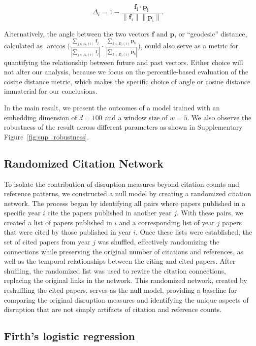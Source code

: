\documentclass[12pt]{article}
\begin{document}
\begin{refsection}
\[
    \Delta_i =1-\frac{\mathbf{f_i}\cdot \mathbf{p_i}}{\| \mathbf{f_i}\| \|\mathbf{p_i}\|}.
\]




Alternatively, the angle between the two vectors $\mathbf{f}$ and $\mathbf{p}$, or ``geodesic'' distance, calculated as  
$\arccos \Big(
    \frac{\sum_{j\in A_c(i)}\mathbf{f}_j}{|\sum_{j\in A_c(i)}\mathbf{f}_j|}
    \cdot 
    \frac{\sum_{k \in D_c(i)} \mathbf{p}_k}{|\sum_{k \in D_c(i)} \mathbf{p}_k|}\Big)
$,
could also serve as a metric for quantifying the relationship between future and past vectors. Either choice will not alter our analysis, because we focus on the percentile-based evaluation of the cosine distance metric, which makes the specific choice of angle or cosine distance immaterial for our conclusions. 


In the main result, we present the outcomes of a model trained with an embedding dimension of $d = 100$ and a window size of $w = 5$. We also observe the robustness of the result across different parameters as shown in Supplementary Figure~\ref{fig:sup_robustness}.



\subsection{Randomized Citation Network}
\label{sec:method_null_model}
To isolate the contribution of disruption measures beyond citation counts and reference patterns, we constructed a null model by creating a randomized citation network. The process began by identifying all pairs where papers published in a specific year $i$ cite the papers published in another year $j$. With these pairs, we created a list of papers published in $i$ and a corresponding list of year $j$ papers that were cited by those published in year $i$. Once these lists were established, the set of cited papers from year $j$ was shuffled, effectively randomizing the connections while preserving the original number of citations and references, as well as the temporal relationships between the citing and cited papers. After shuffling, the randomized list was used to rewire the citation connections, replacing the original links in the network. This randomized network, created by reshuffling the cited papers, serves as the null model, providing a baseline for comparing the original disruption measures and identifying the unique aspects of disruption that are not simply artifacts of citation and reference counts.


\subsection{Firth's logistic regression}


\end{refsection}
\end{document}
